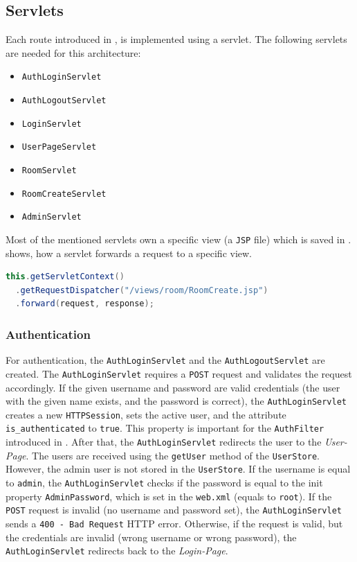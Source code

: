 \subsection{Servlets}\label{subsec:03_impl_servlets}
Each route introduced in , is implemented using a servlet. The following servlets are needed for this architecture:
\begin{itemize}
\item \texttt{AuthLoginServlet}
\item \texttt{AuthLogoutServlet}
\item \texttt{LoginServlet}
\item \texttt{UserPageServlet}
\item \texttt{RoomServlet}
\item \texttt{RoomCreateServlet}
\item \texttt{AdminServlet}
\end{itemize}
Most of the mentioned servlets own a specific view (a \texttt{JSP} file) which is saved in .
%
 shows, how a servlet forwards a request to a specific view.
\begin{lstlisting}[label=lst:03_impl_servlets_includeview, caption=Forward a request to a view, language=java]
this.getServletContext()
  .getRequestDispatcher("/views/room/RoomCreate.jsp")
  .forward(request, response);
\end{lstlisting}


\subsubsection{Authentication}\label{subsubsec:03_impl_servlets_auth}
For authentication, the \texttt{AuthLoginServlet} and the \texttt{AuthLogoutServlet} are created.
The \texttt{AuthLoginServlet} requires a \texttt{POST} request and validates the request accordingly. If the given username and password are valid credentials (the user with the given name exists, and the password is correct), the \texttt{AuthLoginServlet} creates a new \texttt{HTTPSession}, sets the active user, and the attribute \texttt{is\_authenticated} to \texttt{true}. This property is important for the \texttt{AuthFilter} introduced in . After that, the \texttt{AuthLoginServlet} redirects the user to the \textit{User-Page}.
The users are received using the \texttt{getUser} method of the \texttt{UserStore}.
However, the admin user is not stored in the \texttt{UserStore}. If the username is equal to \texttt{admin}, the \texttt{AuthLoginServlet} checks if the password is equal to the init property \texttt{AdminPassword}, which is set in the \texttt{web.xml} (equals to \texttt{root}).
If the \texttt{POST} request is invalid (no username and password set), the \texttt{AuthLoginServlet} sends a \texttt{400 - Bad Request} HTTP error. Otherwise, if the request is valid, but the credentials are invalid (wrong username or wrong password), the \texttt{AuthLoginServlet} redirects back to the \textit{Login-Page}.

